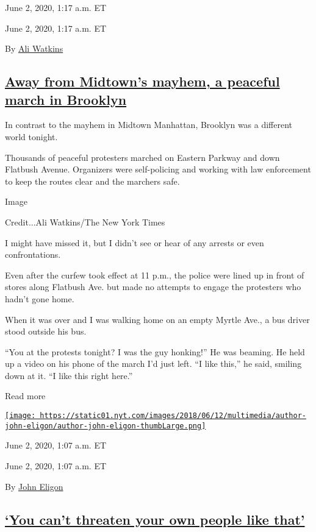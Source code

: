 June 2, 2020, 1:17 a.m. ET

June 2, 2020, 1:17 a.m. ET

By \href{https://www.nytimes.com/by/ali-watkins}{Ali Watkins}

\hypertarget{away-from-midtowns-mayhem-a-peaceful-march-in-brooklyn}{%
\subsection{\texorpdfstring{\protect\hyperlink{away-from-midtowns-mayhem-a-peaceful-march-in-brooklyn}{Away
from Midtown's mayhem, a peaceful march in
Brooklyn}}{Away from Midtown's mayhem, a peaceful march in Brooklyn}}\label{away-from-midtowns-mayhem-a-peaceful-march-in-brooklyn}}

In contrast to the mayhem in Midtown Manhattan, Brooklyn was a different
world tonight.

Thousands of peaceful protesters marched on Eastern Parkway and down
Flatbush Avenue. Organizers were self-policing and working with law
enforcement to keep the routes clear and the marchers safe.

Image

Credit...Ali Watkins/The New York Times

I might have missed it, but I didn't see or hear of any arrests or even
confrontations.

Even after the curfew took effect at 11 p.m., the police were lined up
in front of stores along Flatbush Ave. but made no attempts to engage
the protesters who hadn't gone home.

When it was over and I was walking home on an empty Myrtle Ave., a bus
driver stood outside his bus.

``You at the protests tonight? I was the guy honking!'' He was beaming.
He held up a video on his phone of the march I'd just left. ``I like
this,'' he said, smiling down at it. ``I like this right here.''

Read more

\href{https://www.nytimes.com/by/john-eligon}{\texttt{[image: https://static01.nyt.com/images/2018/06/12/multimedia/author-john-eligon/author-john-eligon-thumbLarge.png]}}

June 2, 2020, 1:07 a.m. ET

June 2, 2020, 1:07 a.m. ET

By \href{https://www.nytimes.com/by/john-eligon}{John Eligon}

\hypertarget{you-cant-threaten-your-own-people-like-that}{%
\subsection{\texorpdfstring{\protect\hyperlink{you-cant-threaten-your-own-people-like-that}{`You
can't threaten your own people like
that'}}{`You can't threaten your own people like that'}}\label{you-cant-threaten-your-own-people-like-that}}

